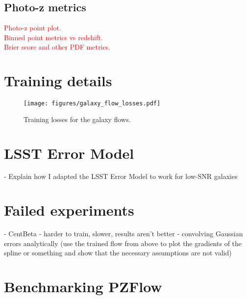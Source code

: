 \documentclass[twocolumn]{aastex631}
\newcommand{\note}[1]{\textsf{\textcolor{red}{#1}}}
\begin{document}
\subsection{Photo-z metrics}

\note{
    Photo-z point plot. \\
    Binned point metrics vs redshift. \\
    Brier score and other PDF metrics.
}


\appendix

\section{Training details}

\begin{figure*}[t!]
    \begin{centering}
        \texttt{[image: figures/galaxy\_flow\_losses.pdf]}
        \caption{
            Training losses for the galaxy flows.
        }
        \label{fig:galaxy-flow-losses}
    \end{centering}
\end{figure*}

\section{LSST Error Model}

- Explain how I adapted the LSST Error Model to work for low-SNR galaxies

\section{Failed experiments}

- CentBeta - harder to train, slower, results aren't better
- convolving Gaussian errors analytically (use the trained flow from above to plot the gradients of the spline or something and show that the necessary assumptions are not valid)

\section{Benchmarking PZFlow}



\end{document}
